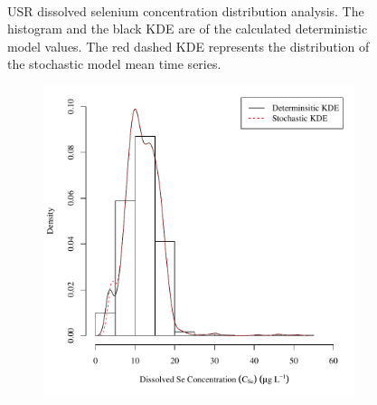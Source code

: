 \begin{landscape}
\begin{figure}
\begin{subfigure}{0.7\textwidth}
		\end{subfigure}\\
		\caption[USR dissolved selenium concentration distribution analysis.]{USR dissolved selenium concentration distribution analysis.  The histogram and the black KDE are of the calculated deterministic model values.  The red dashed KDE represents the distribution of the stochastic model mean time series.}
		\label{fig:concCSeDist_US}
	\end{figure}
\end{landscape}

\subfiguremid
\begin{landscape}
	\begin{figure}
		\begin{subfigure}{0.7\textwidth}
			\centering
			\includegraphics[width=\tableCustomSize]{"Figures/Results_USR/Stochastic/c d&s est CAN"}
		\end{subfigure}%
		\begin{subfigure}{0.7\textwidth}
			\centering

\end{subfigure}
\end{figure}
\end{landscape}
